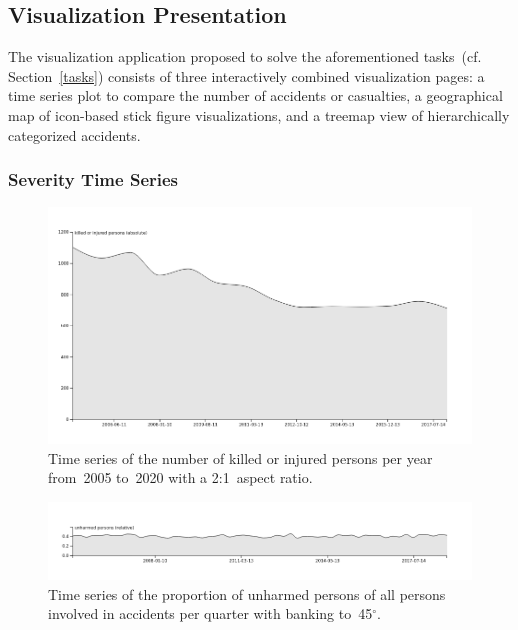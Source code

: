 \subsection{Visualization Presentation}
\label{presentation}
The visualization application proposed to solve the aforementioned tasks~(cf. Section~\ref{tasks}) consists of three interactively combined visualization pages: \Ni a time series plot to compare the number of accidents or casualties, \Nii a geographical map of icon-based stick figure visualizations, and \Niii a treemap view of hierarchically categorized accidents.

\subsubsection{Severity Time Series}
\begin{figure}
    \centering
    \includegraphics[width=0.9\linewidth]{figures/time-series-2-to-1-killed-or-injured-absolute-never-per-year}
    \caption{Time series of the number of killed or injured persons per year from~2005 to~2020 with a 2:1~aspect ratio.}
    \label{figure-time-series-killed-injured-per-year}
\end{figure}
\begin{figure}
    \centering
    \includegraphics[width=0.9\linewidth]{figures/time-series-banking-45-unharmed-relative-never-per-quarter}
    \caption{Time series of the proportion of unharmed persons of all persons involved in accidents per quarter with banking to~45\(^\circ\).}
    \label{figure-time-series-banking-unharmed-relative-per-quarter}
\end{figure}
